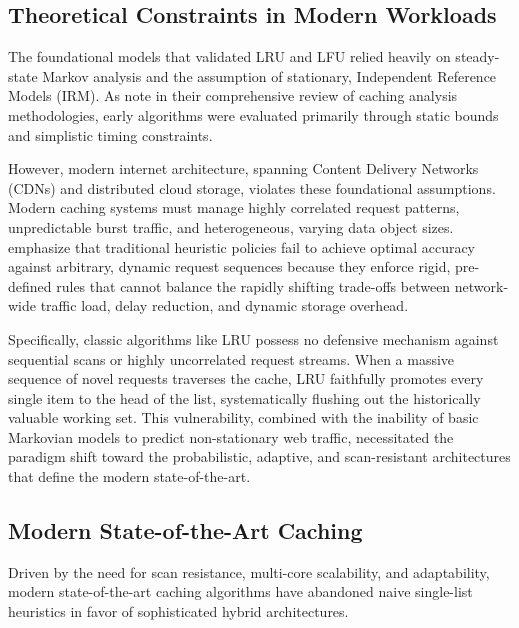 \subsection{Theoretical Constraints in Modern Workloads}
The foundational models that validated LRU and LFU relied heavily on steady-state Markov analysis and the assumption of stationary, Independent Reference Models (IRM). As  note in their comprehensive review of caching analysis methodologies, early algorithms were evaluated primarily through static bounds and simplistic timing constraints.

However, modern internet architecture, spanning Content Delivery Networks (CDNs) and distributed cloud storage, violates these foundational assumptions. Modern caching systems must manage highly correlated request patterns, unpredictable burst traffic, and heterogeneous, varying data object sizes.  emphasize that traditional heuristic policies fail to achieve optimal accuracy against arbitrary, dynamic request sequences because they enforce rigid, pre-defined rules that cannot balance the rapidly shifting trade-offs between network-wide traffic load, delay reduction, and dynamic storage overhead.

Specifically, classic algorithms like LRU possess no defensive mechanism against sequential scans or highly uncorrelated request streams. When a massive sequence of novel requests traverses the cache, LRU faithfully promotes every single item to the head of the list, systematically flushing out the historically valuable working set. This vulnerability, combined with the inability of basic Markovian models to predict non-stationary web traffic, necessitated the paradigm shift toward the probabilistic, adaptive, and scan-resistant architectures that define the modern state-of-the-art.

\subsection{Modern State-of-the-Art Caching}
Driven by the need for scan resistance, multi-core scalability, and adaptability, modern state-of-the-art caching algorithms have abandoned naive single-list heuristics in favor of sophisticated hybrid architectures.

